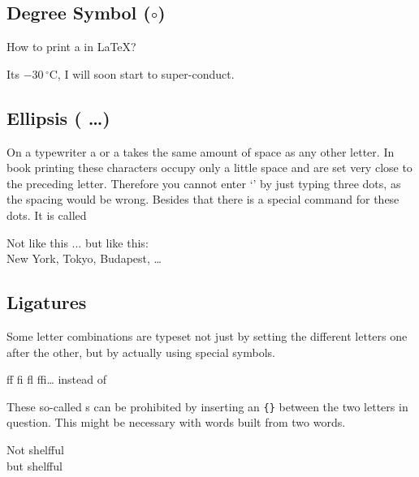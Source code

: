 \subsection{Degree Symbol ($\circ$)}

How to print a  in \LaTeX{}?

\begin{example}
Its $-30\,^{\circ}\mathrm{C}$,
I will soon start to
super-conduct.
\end{example}

\subsection{Ellipsis ( \ldots )}

On a typewriter a  or a  takes the same amount of
space as any other letter. In book printing these characters occupy
only a little space and are set very close to the preceding letter.
Therefore you cannot enter `' by just typing three
dots, as the spacing would be wrong. Besides that there is a special
command for these dots. It is called

\begin{lscommand}
\end{lscommand}


\begin{example}
Not like this ... but like this:\\
New York, Tokyo, Budapest, \ldots
\end{example}
 
\subsection{Ligatures}

Some letter combinations are typeset not just by setting the
different letters one after the other, but by actually using special
symbols.
\begin{code}
{\large ff fi fl ffi\ldots}\quad
instead of
\end{code}
These so-called s can be prohibited by inserting an \verb|{}|
between the two letters in question. This might be necessary with
words built from two words.

\begin{example}
Not shelfful\\
but shelf\mbox{}ful
\end{example}
 
